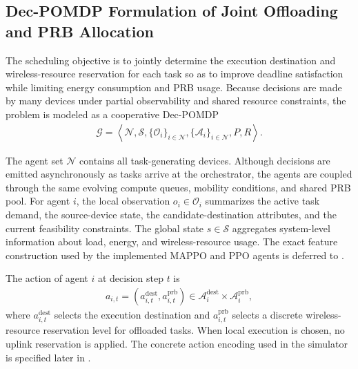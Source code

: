 \subsection{Dec-POMDP Formulation of Joint Offloading and PRB Allocation}
\label{subsec:problem-formulation}

The scheduling objective is to jointly determine the execution destination and wireless-resource reservation for each task so as to improve deadline satisfaction while limiting energy consumption and PRB usage. Because decisions are made by many devices under partial observability and shared resource constraints, the problem is modeled as a cooperative Dec-POMDP
\begin{align*}
\mathcal{G} = \left\langle \mathcal{N}, \mathcal{S}, \{\mathcal{O}_i\}_{i \in \mathcal{N}},
\{\mathcal{A}_i\}_{i \in \mathcal{N}}, P, R \right\rangle .
\end{align*}

The agent set \(\mathcal{N}\) contains all task-generating devices. Although decisions are emitted asynchronously as tasks arrive at the orchestrator, the agents are coupled through the same evolving compute queues, mobility conditions, and shared PRB pool. For agent \(i\), the local observation \(o_i \in \mathcal{O}_i\) summarizes the active task demand, the source-device state, the candidate-destination attributes, and the current feasibility constraints. The global state \(s \in \mathcal{S}\) aggregates system-level information about load, energy, and wireless-resource usage. The exact feature construction used by the implemented MAPPO and PPO agents is deferred to .

The action of agent \(i\) at decision step \(t\) is
\begin{align*}
a_{i,t} = \left(a_{i,t}^{\mathrm{dest}}, a_{i,t}^{\mathrm{prb}}\right) \in
\mathcal{A}_i^{\mathrm{dest}} \times \mathcal{A}_i^{\mathrm{prb}},
\end{align*}
where \(a_{i,t}^{\mathrm{dest}}\) selects the execution destination and \(a_{i,t}^{\mathrm{prb}}\) selects a discrete wireless-resource reservation level for offloaded tasks. When local execution is chosen, no uplink reservation is applied. The concrete action encoding used in the simulator is specified later in .


